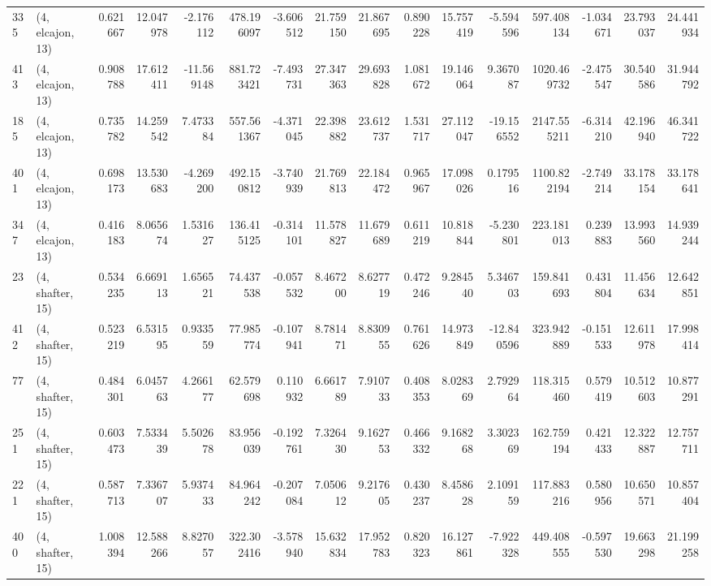 \begin{tabular}{llrrrrrrrrrrrrrr}
335 &  (4, elcajon, 13) &   0.621667 &  12.047978 &  -2.176112 &   478.196097 &  -3.606512 &  21.759150 &  21.867695 &  0.890228 &  15.757419 &  -5.594596 &   597.408134 &  -1.034671 &  23.793037 &  24.441934 \\
413 &  (4, elcajon, 13) &   0.908788 &  17.612411 & -11.569148 &   881.723421 &  -7.493731 &  27.347363 &  29.693828 &  1.081672 &  19.146064 &   9.367087 &  1020.469732 &  -2.475547 &  30.540586 &  31.944792 \\
185 &  (4, elcajon, 13) &   0.735782 &  14.259542 &   7.473384 &   557.561367 &  -4.371045 &  22.398882 &  23.612737 &  1.531717 &  27.112047 & -19.156552 &  2147.555211 &  -6.314210 &  42.196940 &  46.341722 \\
401 &  (4, elcajon, 13) &   0.698173 &  13.530683 &  -4.269200 &   492.150812 &  -3.740939 &  21.769813 &  22.184472 &  0.965967 &  17.098026 &   0.179516 &  1100.822194 &  -2.749214 &  33.178154 &  33.178641 \\
347 &  (4, elcajon, 13) &   0.416183 &   8.065674 &   1.531627 &   136.415125 &  -0.314101 &  11.578827 &  11.679689 &  0.611219 &  10.818844 &  -5.230801 &   223.181013 &   0.239883 &  13.993560 &  14.939244 \\
23  &  (4, shafter, 15) &   0.534235 &   6.669113 &   1.656521 &    74.437538 &  -0.057532 &   8.467200 &   8.627719 &  0.472246 &   9.284540 &   5.346703 &   159.841693 &   0.431804 &  11.456634 &  12.642851 \\
412 &  (4, shafter, 15) &   0.523219 &   6.531595 &   0.933559 &    77.985774 &  -0.107941 &   8.781471 &   8.830955 &  0.761626 &  14.973849 & -12.840596 &   323.942889 &  -0.151533 &  12.611978 &  17.998414 \\
77  &  (4, shafter, 15) &   0.484301 &   6.045763 &   4.266177 &    62.579698 &   0.110932 &   6.661789 &   7.910733 &  0.408353 &   8.028369 &   2.792964 &   118.315460 &   0.579419 &  10.512603 &  10.877291 \\
251 &  (4, shafter, 15) &   0.603473 &   7.533439 &   5.502678 &    83.956039 &  -0.192761 &   7.326430 &   9.162753 &  0.466332 &   9.168268 &   3.302369 &   162.759194 &   0.421433 &  12.322887 &  12.757711 \\
221 &  (4, shafter, 15) &   0.587713 &   7.336707 &   5.937433 &    84.964242 &  -0.207084 &   7.050612 &   9.217605 &  0.430237 &   8.458628 &   2.109159 &   117.883216 &   0.580956 &  10.650571 &  10.857404 \\
400 &  (4, shafter, 15) &   1.008394 &  12.588266 &   8.827057 &   322.302416 &  -3.578940 &  15.632834 &  17.952783 &  0.820323 &  16.127861 &  -7.922328 &   449.408555 &  -0.597530 &  19.663298 &  21.199258 \\

\end{tabular}
